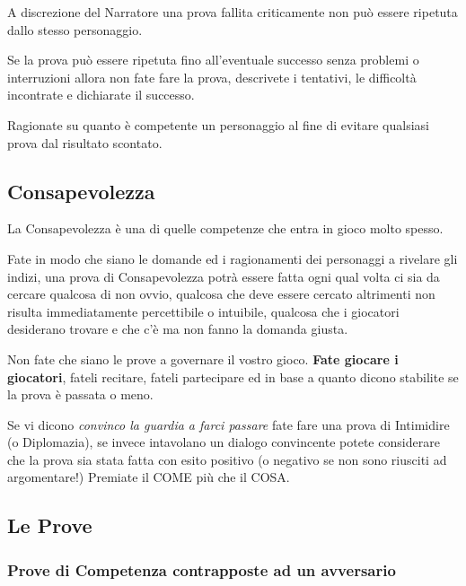 \begin{multicols}{2}
A discrezione del Narratore una prova fallita criticamente non può essere ripetuta dallo stesso personaggio.

\begin{narratore}
Se la prova può essere ripetuta fino all'eventuale successo senza problemi o interruzioni allora non fate fare la prova, descrivete i tentativi, le difficoltà incontrate e dichiarate il successo.
\end{narratore}

Ragionate su quanto è competente un personaggio al fine di evitare qualsiasi prova dal risultato scontato.

\subsection{Consapevolezza}\label{consapevolezza2}

La Consapevolezza è una di quelle competenze che entra in gioco molto spesso.

Fate in modo che siano le domande ed i ragionamenti dei personaggi a rivelare gli indizi, una prova di Consapevolezza potrà essere fatta ogni qual volta ci sia da cercare qualcosa di non ovvio, qualcosa che deve essere cercato altrimenti non risulta immediatamente percettibile o intuibile, qualcosa che i giocatori desiderano trovare e che c'è ma non fanno la domanda giusta.

\begin{narratore}
Non fate che siano le prove a governare il vostro gioco. \textbf{Fate giocare i giocatori}, fateli recitare, fateli partecipare ed in base a quanto dicono stabilite se la prova è passata o meno.

Se vi dicono \emph{convinco la guardia a farci passare} fate fare una prova di Intimidire (o Diplomazia), se invece intavolano un dialogo convincente potete considerare che la prova sia stata fatta con esito positivo (o negativo se non sono riusciti ad argomentare!) Premiate il COME più che il COSA.
\end{narratore}

\subsection{Le Prove}\label{proveopposte}

\subsubsection{Prove di Competenza contrapposte ad un avversario}


\end{multicols}
